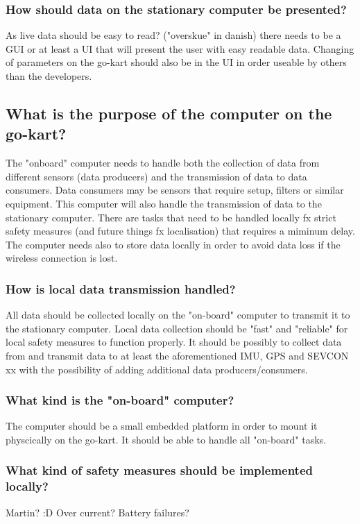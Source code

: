\subsubsection*{How should data on the stationary computer be presented?}
As live data should be easy to read? ("overskue" in danish) there needs to be a GUI or at least a UI that will present the user with easy readable data. 
Changing of parameters on the go-kart should also be in the UI in order useable by others than the developers.

\subsection{What is the purpose of the computer on the go-kart?}
The "onboard" computer needs to handle both the collection
of data from different sensors (data producers) and the transmission of data to 
data consumers.
Data consumers may be sensors that require setup, filters or similar equipment.
This computer will also handle the transmission of data to the stationary 
computer.
There are tasks that need to be handled locally fx strict safety measures (and future things fx localisation) that requires a miminum delay. 
The computer needs also to store data locally in order to avoid data loss if the wireless connection is lost.

\subsubsection*{How is local data transmission handled?}
All data should be collected locally on the "on-board" computer to transmit it to the stationary computer.
Local data collection should be "fast" and "reliable" for local safety measures to function properly.
It should be possibly to collect data from and transmit data to at least the 
aforementioned IMU, GPS and SEVCON xx with the possibility of adding additional 
data producers/consumers.

\subsubsection*{What kind is the "on-board" computer?}
The computer should be a small embedded platform in order to mount it physcically on the go-kart.
It should be able to handle all "on-board" tasks.

\subsubsection*{What kind of safety measures should be implemented locally?}
Martin? :D Over current? Battery failures?

